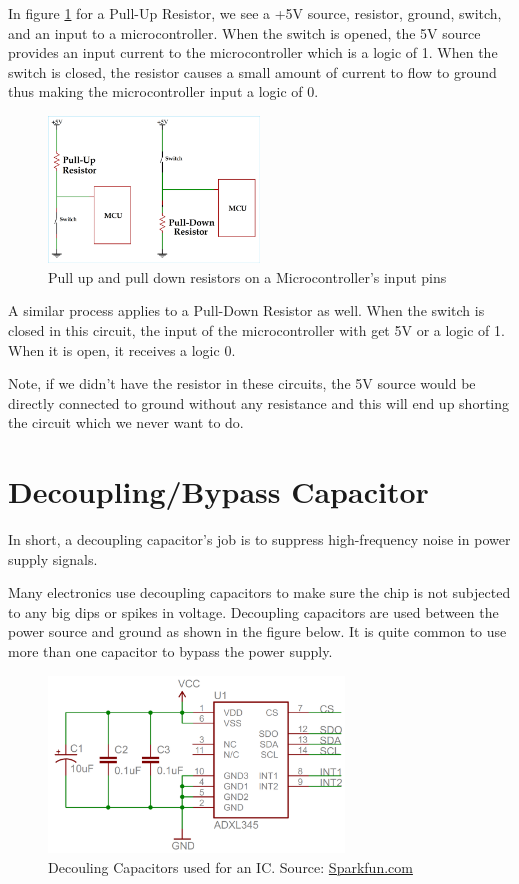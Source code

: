 \documentclass{article}
\begin{document}
In figure \ref{fig:PullUpDown} for a Pull-Up Resistor, we see a +5V source, resistor, ground, switch, and an input to a microcontroller. When the switch is opened, the 5V source provides an input current to the microcontroller which is a logic of 1. When the switch is closed, the resistor causes a small amount of current to flow to ground thus making the microcontroller input a logic of 0. 

\begin{figure} [h]
    \centering
    \includegraphics[width = 0.5\textwidth]{img/Pull-up-and-Pull-down-Resistor.png}
    \caption{Pull up and pull down resistors on a Microcontroller's input pins}
    \label{fig:PullUpDown}
\end{figure}

A similar process applies to a Pull-Down Resistor as well. When the switch is closed in this circuit, the input of the microcontroller with get 5V or a logic of 1. When it is open, it receives a logic 0.

Note, if we didn’t have the resistor in these circuits, the 5V source would be directly connected to ground without any resistance and this will end up shorting the circuit which we never want to do.

\section{Decoupling/Bypass Capacitor}
In short, a decoupling capacitor's job is to suppress high-frequency noise in power supply signals.

Many electronics use decoupling capacitors to make sure the chip is not subjected to any big dips or spikes in voltage.
Decoupling capacitors are used between the power source and ground as shown in the figure below. It is quite common to use more than one capacitor to bypass the power supply. 

\begin{figure} [h]
    \centering
    \includegraphics[width=0.7\textwidth]{img/DecouplingCap.png}
    \caption{Decouling Capacitors used for an IC. Source: \href{https://learn.sparkfun.com/tutorials/capacitors/application-examples}{Sparkfun.com}}
    \label{fig:DecouplingCap}
\end{figure}
\end{document}
